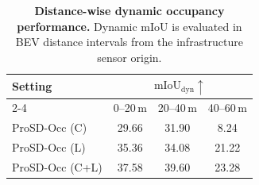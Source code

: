 \begin{table}[!tbp]
\caption{\textbf{Distance-wise dynamic occupancy performance.} Dynamic mIoU is evaluated in BEV distance intervals from the infrastructure sensor origin.}
\label{tab:distance_robustness}
\centering
\scriptsize
\setlength{\tabcolsep}{3.6pt}
\renewcommand{\arraystretch}{1.08}
\begin{tabular*}{\columnwidth}{@{\extracolsep{\fill}}lccc@{}}
\toprule
Setting & \multicolumn{3}{c}{$\mathrm{mIoU}_{\mathrm{dyn}}\uparrow$} \\
\cmidrule(lr){2-4}
& 0--20\,m & 20--40\,m & 40--60\,m \\
\midrule
ProSD-Occ (C) & 29.66 & 31.90 & 8.24 \\
ProSD-Occ (L) & 35.36 & 34.08 & 21.22 \\
ProSD-Occ (C+L) & 37.58 & 39.60 & 23.28 \\
\bottomrule
\end{tabular*}
\end{table}
